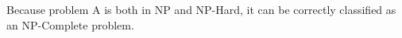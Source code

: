 \documentclass[11pt]{article}
\begin{document}
Because problem A is both in NP and NP-Hard, it can be correctly classified as an NP-Complete problem.
























\end{document}
